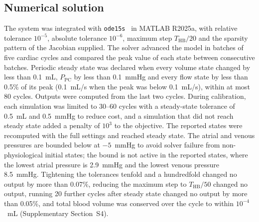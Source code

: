 \FloatBarrier
\subsection{Numerical solution}
\label{sec:numerics}
The system was integrated with \texttt{ode15s}~\cite{Shampine1997} in MATLAB R2025a, with relative tolerance $10^{-5}$, absolute tolerance $10^{-6}$, maximum step $T_{\mathrm{HB}}/20$ and the sparsity pattern of the Jacobian supplied. The solver advanced the model in batches of five cardiac cycles and compared the peak value of each state between consecutive batches. Periodic steady state was declared when every volume state changed by less than 0.1~mL, $P_{\mathrm{PC}}$ by less than 0.1~mmHg and every flow state by less than 0.5\% of its peak (0.1~mL/s when the peak was below 0.1~mL/s), within at most 80 cycles. Outputs were computed from the last two cycles. During calibration, each simulation was limited to 30--60 cycles with a steady-state tolerance of 0.5~mL and 0.5~mmHg to reduce cost, and a simulation that did not reach steady state added a penalty of $10^{3}$ to the objective. The reported states were recomputed with the full settings and reached steady state. The atrial and venous pressures are bounded below at $-5$~mmHg to avoid solver failure from non-physiological initial states; the bound is not active in the reported states, where the lowest atrial pressure is 2.9~mmHg and the lowest venous pressure 8.5~mmHg. Tightening the tolerances tenfold and a hundredfold changed no output by more than 0.07\%, reducing the maximum step to $T_{\mathrm{HB}}/50$ changed no output, running 20 further cycles after steady state changed no output by more than 0.05\%, and total blood volume was conserved over the cycle to within $10^{-4}$~mL (Supplementary Section~S4).

\FloatBarrier
